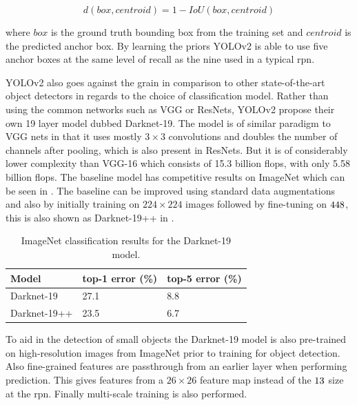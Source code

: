 \begin{equation}
  d(box, centroid) = 1 - IoU(box, centroid)
\end{equation}

where $box$ is the ground truth bounding box from the training set and $centroid$ is the predicted anchor box. By learning the priors YOLOv2 is able to use five anchor boxes at the same level of recall as the nine used in a typical \gls{rpn}.

YOLOv2 also goes against the grain in comparison to other state-of-the-art object detectors in regards to the choice of classification model. Rather than using the common networks such as VGG or ResNets, YOLOv2 propose their own 19 layer model dubbed Darknet-19. The model is of similar paradigm to VGG nets in that it uses mostly $3 \times 3$ convolutions and doubles the number of channels after pooling, which is also present in ResNets. But it is of considerably lower complexity than VGG-16 which consists of 15.3 billion \gls{flops}, with only 5.58 billion \gls{flops}. The baseline model has competitive results on ImageNet which can be seen in . The baseline can be improved using standard data augmentations and also by initially training on $224 \times 224$ images followed by fine-tuning on $448 \time 448$, this is also shown as Darknet-19++ in .

\begin{table}[]
\centering
\caption{ImageNet classification results for the Darknet-19 model.}
\label{tab:darknetimagenet}
\begin{tabular}{|l|l|l|}
\hline
Model                                                                                       & top-1 error (\%) & top-5 error (\%) \\ \hline
Darknet-19                                                                                  & 27.1             & 8.8              \\ \hline
Darknet-19++ & 23.5             & 6.7              \\ \hline
\end{tabular}
\end{table}

To aid in the detection of small objects the Darknet-19 model is also pre-trained on high-resolution images from ImageNet prior to training for object detection. Also fine-grained features are passthrough from an earlier layer when performing prediction. This gives features from a $26 \times 26$ feature map instead of the $13 \time 13$ size at the \gls{rpn}. Finally multi-scale training is also performed.

